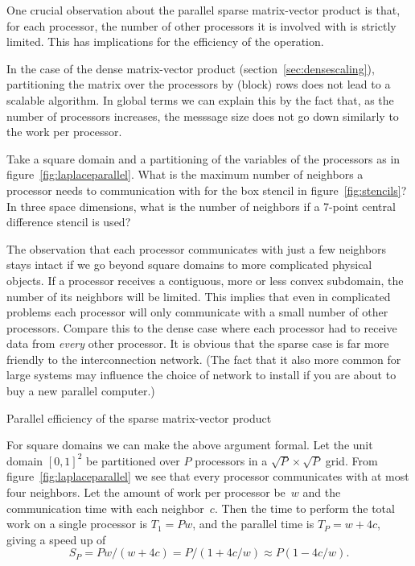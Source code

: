 One crucial observation about the parallel sparse matrix-vector
product
is that, for each processor, the number of
other processors it is involved with is strictly limited. This has
implications for the efficiency of the operation.

In the case of the dense matrix-vector 
  product (section~\ref{sec:densescaling}),
partitioning the matrix over the
processors by (block) rows does not lead to a scalable algorithm.
In global terms we can explain this by the fact that,
as the number of processors increases,
the messsage size does not go down similarly to the work per processor.
%


\begin{exercise}
    Take a square domain and a partitioning of the variables of the
    processors as in figure~\ref{fig:laplaceparallel}.
    What is the maximum number of neighbors a
    processor needs to communication with for the box stencil in
    figure~\ref{fig:stencils}? In three space dimensions, what is the
    number of neighbors if a 7-point central difference stencil is
    used?
\end{exercise}

The observation that each processor communicates with just a few
neighbors stays intact if we go beyond square domains to more
complicated physical objects.
If a processor receives a contiguous, more or less convex subdomain,
the number of its neighbors will be
limited. This implies that even in complicated problems each processor
will only communicate with a small number of other processors. Compare
this to the dense case where each processor had to receive data from
\emph{every} other processor. It is obvious that the sparse case is
far more friendly to the interconnection network. (The fact that it
also more common for large systems may influence the choice of network
to install if you are about to buy a new parallel computer.)


 {Parallel efficiency of the sparse matrix-vector product}
\label{sec:par-spmvp}

For square domains we can make the above argument formal.
Let the
unit domain $[0,1]^2$ be partitioned over $P$ processors in a $\sqrt
P\times \sqrt P$ grid. From figure~\ref{fig:laplaceparallel} we see
that every processor communicates with at most four neighbors. Let
the amount of work per processor be~$w$ and the communication time
with each neighbor~$c$. Then the time to perform the total work on a
single processor is $T_1=Pw$, and the parallel time is $T_P=w+4c$,
giving a speed up of
\[ S_P=Pw/(w+4c)=P/(1+4c/w)\approx P(1-4c/w). \]

